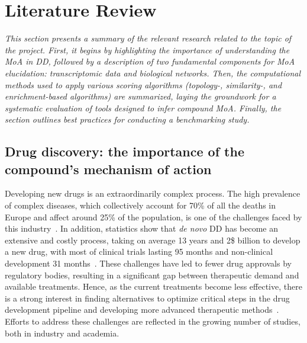 ﻿%

%

\chapter{Literature Review}
\label{cha:literaturereview}

\textit{This section presents a summary of the relevant research related to the topic of the project.
First, it begins by highlighting the importance of understanding the \gls{MoA} in \gls{DD}, followed by a description of two fundamental components for \gls{MoA} elucidation: transcriptomic data and biological networks.
Then, the computational methods used to apply various scoring algorithms (topology-, similarity-, and enrichment-based algorithms) are summarized, laying the groundwork for a systematic evaluation of tools designed to infer compound \gls{MoA}.
Finally, the section outlines best practices for conducting a benchmarking study.}

\section{Drug discovery: the importance of the compound's mechanism of action} %
\label{sec:drugdiscoverytheimportanceofthecompoundsmechanismofaction}

Developing new drugs is an extraordinarily complex process.
The high prevalence of complex diseases, which collectively account for 70\% of all the deaths in Europe and affect around 25\% of the population, is one of the challenges faced by this industry~\cite{RN43}.
In addition, statistics show that \textit{de novo} \gls{DD} has become an extensive and costly process, taking on average 13 years and 2\$ billion to develop a new drug, with most of clinical trials lasting 95 months and non-clinical development 31 months~\cite{RN55,RN56,RN47}.
These challenges have led to fewer drug approvals by regulatory bodies, resulting in a significant gap between therapeutic demand and available treatments. Hence, as the current treatments become less effective, there is a strong interest in finding alternatives to optimize critical steps in the drug development pipeline and developing more advanced therapeutic methods~\cite{RN44}.
Efforts to address these challenges are reflected in the growing number of studies, both in industry and academia.

